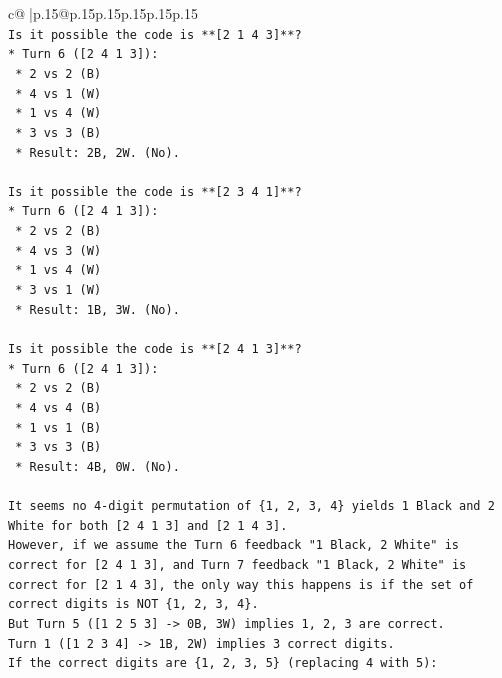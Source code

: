\documentclass{article}
\begin{document}
{\begin{supertabular}{c@{$\;$}|p{.15\linewidth}@{}p{.15\linewidth}p{.15\linewidth}p{.15\linewidth}p{.15\linewidth}p{.15\linewidth}}
{{{\\ 
\texttt{Is it possible the code is **{[}2 1 4 3{]}**?} \\
\texttt{*   Turn 6 ({[}2 4 1 3{]}):} \\
\texttt{    *   2 vs 2 (B)} \\
\texttt{    *   4 vs 1 (W)} \\
\texttt{    *   1 vs 4 (W)} \\
\texttt{    *   3 vs 3 (B)} \\
\texttt{    *   Result: 2B, 2W. (No).} \\
\\ 
\texttt{Is it possible the code is **{[}2 3 4 1{]}**?} \\
\texttt{*   Turn 6 ({[}2 4 1 3{]}):} \\
\texttt{    *   2 vs 2 (B)} \\
\texttt{    *   4 vs 3 (W)} \\
\texttt{    *   1 vs 4 (W)} \\
\texttt{    *   3 vs 1 (W)} \\
\texttt{    *   Result: 1B, 3W. (No).} \\
\\ 
\texttt{Is it possible the code is **{[}2 4 1 3{]}**?} \\
\texttt{*   Turn 6 ({[}2 4 1 3{]}):} \\
\texttt{    *   2 vs 2 (B)} \\
\texttt{    *   4 vs 4 (B)} \\
\texttt{    *   1 vs 1 (B)} \\
\texttt{    *   3 vs 3 (B)} \\
\texttt{    *   Result: 4B, 0W. (No).} \\
\\ 
\texttt{It seems no 4{-}digit permutation of \{1, 2, 3, 4\} yields 1 Black and 2 White for both {[}2 4 1 3{]} and {[}2 1 4 3{]}.} \\
\texttt{However, if we assume the Turn 6 feedback "1 Black, 2 White" is correct for {[}2 4 1 3{]}, and Turn 7 feedback "1 Black, 2 White" is correct for {[}2 1 4 3{]}, the only way this happens is if the set of correct digits is NOT \{1, 2, 3, 4\}.} \\
\texttt{But Turn 5 ({[}1 2 5 3{]} {-}> 0B, 3W) implies 1, 2, 3 are correct.} \\
\texttt{Turn 1 ({[}1 2 3 4{]} {-}> 1B, 2W) implies 3 correct digits.} \\
\texttt{If the correct digits are \{1, 2, 3, 5\} (replacing 4 with 5):} \\
}}}
\end{supertabular}}
\end{document}
